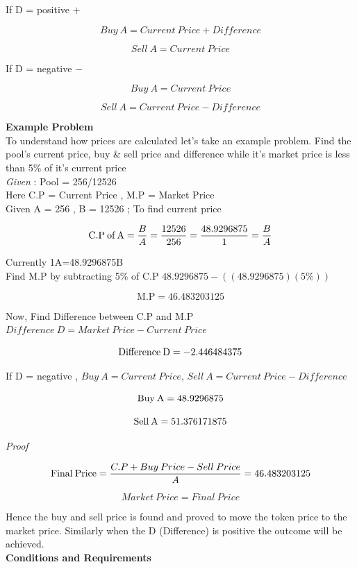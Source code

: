 \documentclass[conference]{IEEEtran}
\begin{document}
If D = positive $+$

\[Buy\:A=Current\:Price+Difference\]

\[Sell\:A=Current\:Price\]

If D = negative $-$

\[Buy\:A=Current\:Price\]

\[Sell\:A=Current\:Price-Difference\]



\textbf{Example Problem}\\

To understand how prices are calculated let's take an example problem. Find the pool's current price, buy \& sell price and difference while it's market price is less than 5\% of it's current price\\

\textit{Given} : Pool = 256/12526\\

Here C.P = Current Price , M.P = Market Price\\

Given A = 256 , B = 12526 ;
To find current price 

\[\text{C.P\:of\:A}=\frac{B}{A}=\frac{12526}{256}=\frac{48.9296875}{1}=\frac{B}{A}\]


Currently 1A=48.9296875B\\

Find M.P by subtracting 5\% of C.P $48.9296875 - ((48.9296875)(5\%))$ 

\[\text{M.P} = 46.483203125\]

Now, Find Difference between C.P and M.P $Difference\:D = Market\:Price - Current\:Price$

\[\text{Difference\:D} = -2.446484375\]

If D = negative , $Buy\:A=Current\:Price$, $Sell\:A=Current\:Price-Difference$

\[\text{Buy\:A} = 48.9296875\]

\[\text{Sell\:A} = 51.376171875\]

\textit{Proof}

\[\text{Final\:Price}=\frac{C.P+Buy\:Price - Sell\:Price}{A} = 46.483203125\]

\[Market\:Price=Final\:Price\]

Hence the buy and sell price is found and proved to move the token price to the market price. Similarly when the D (Difference) is positive the outcome will be achieved. \\


\textbf{Conditions and Requirements}\\
\end{document}
